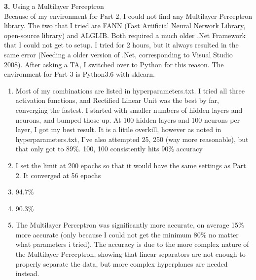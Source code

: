 \documentclass[titlepage]{article}
\begin{document}
\pagebreak

\noindent \textbf{3. } Using a Multilayer Perceptron \\

Because of my environment for Part 2, I could not find any Multilayer Perceptron library. The two that I tried are FANN (Fast Artificial Neural Network Library, open-source library) and ALGLIB. Both required a much older .Net Framework that I could not get to setup. I tried for 2 hours, but it always resulted in the same error (Needing a older version of .Net, corresponding to Visual Studio 2008). After asking a TA, I switched over to Python for this reason.
The environment for Part 3 is Python3.6 with sklearn.

\begin{enumerate}
	\item Most of my combinations are listed in hyperparameters.txt. I tried all three activation functions, and Rectified Linear Unit was the best by far, converging the fastest. I started with smaller numbers of hidden layers and neurons, and bumped those up. At 100 hidden layers and 100 neurons per layer, I got my best result. It is a little overkill, however as noted in hyperparameters.txt, I've also attempted 25, 250 (way more reasonable), but that only got to 89\%. 100, 100 consistently hits 90\% accuracy
	\item I set the limit at 200 epochs so that it would have the same settings as Part 2. It converged at 56 epochs
	\item 94.7\%
	\item 90.3\%
	\item The Multilayer Perceptron was significantly more accurate, on average 15\% more accurate (only because I could not get the minimum 80\% no matter what parameters i tried). The accuracy is due to the more complex nature of the Multilayer Perceptron, showing that linear separators are not enough to properly separate the data, but more complex hyperplanes are needed instead.
\end{enumerate}
\end{document}
